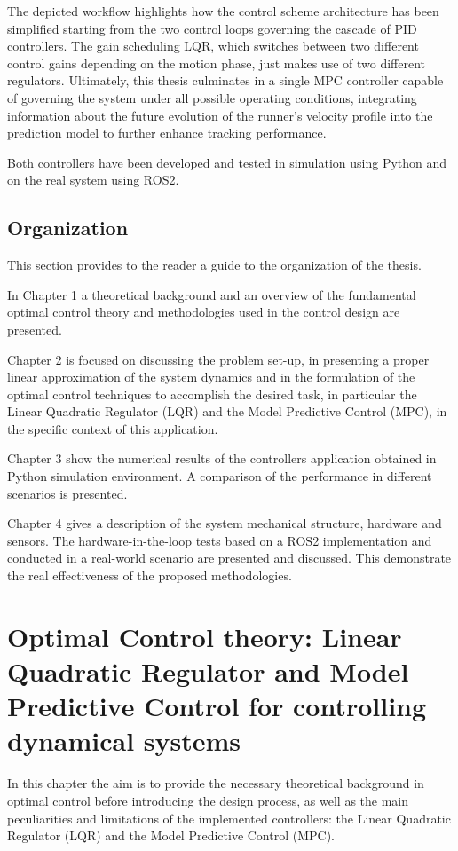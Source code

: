 \documentclass[a4paper,12pt,oneside]{book}
\begin{document}
\bigskip
The depicted workflow highlights how the control scheme architecture has been simplified starting from the two control loops governing the cascade of PID controllers. The gain scheduling LQR, which switches between two different control gains depending on the motion phase, just makes use of two different regulators. Ultimately, this thesis culminates in a single MPC controller capable of governing the system under all possible operating conditions, integrating information about the future evolution of the runner's velocity profile into the prediction model to further enhance tracking performance.

\bigskip
Both controllers have been developed and tested in simulation using Python and on the real system using ROS2.

\section*{Organization}
This section provides to the reader a guide to the organization of the thesis. 

In Chapter 1 a theoretical background and an overview of the fundamental optimal control theory and methodologies used in the control design are presented. 

Chapter 2 is focused on discussing the problem set-up, in presenting a proper linear approximation of the system dynamics and in the formulation of the optimal control techniques to accomplish the desired task, in particular the Linear Quadratic Regulator (LQR) and the Model Predictive Control (MPC), in the specific context of this application.

Chapter 3 show the numerical results of the controllers application obtained in Python simulation environment. A comparison of the performance in different scenarios is presented.

Chapter 4 gives a description of the system mechanical structure, hardware and sensors. The hardware-in-the-loop tests based on a ROS2 implementation and conducted in a real-world scenario are presented and discussed.
This demonstrate the real effectiveness of the proposed methodologies.

\chapter{Optimal Control theory: Linear Quadratic Regulator and Model Predictive Control for controlling dynamical systems}
In this chapter the aim is to provide the necessary theoretical background in optimal control before introducing the design process, as well as the main peculiarities and limitations of the implemented controllers: the Linear Quadratic Regulator (LQR) and the Model Predictive Control (MPC).
\end{document}
